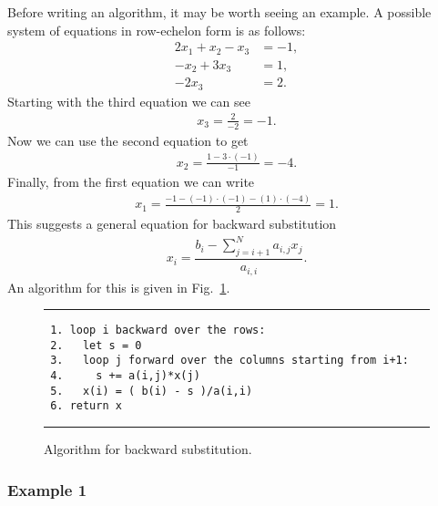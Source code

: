 Before writing an algorithm, it may be worth seeing an example. A possible system of equations in row-echelon form is as follows:
\begin{align}
  2x_1 + x_2 - x_3  &= -1, \nonumber \\
        -x_2 + 3x_3 &= 1, \nonumber \\
              -2x_3 &= 2. \nonumber
\end{align}
Starting with the third equation we can see
\begin{align}
  x_3 = \frac{2}{-2} = -1. \nonumber
\end{align}
Now we can use the second equation to get
\begin{align}
  x_2 = \frac{1 - 3\cdot(-1)}{-1} = -4. \nonumber
\end{align}
Finally, from the first equation we can write
\begin{align}
  x_1 = \frac{-1 - (-1)\cdot(-1) - (1)\cdot(-4)}{2} = 1. \nonumber
\end{align}
This suggests a general equation for backward substitution
\begin{align}
  x_i = \dfrac{ b_i - \displaystyle\sum_{j=i+1}^N a_{i,j} x_j }{ a_{i,i} }.
\end{align}
An algorithm for this is given in Fig.~\ref{Fig:linearAlgebra_backwardSubstitutionAlgorithm}.

\begin{figure}[htb!]
\begin{center}
\noindent \rule{\textwidth}{1pt}
\begin{verbatim}
 1.	loop i backward over the rows:
 2.	  let s = 0
 3.	  loop j forward over the columns starting from i+1:
 4.	    s += a(i,j)*x(j)
 5.	  x(i) = ( b(i) - s )/a(i,i)
 6.	return x
\end{verbatim}
\rule{\textwidth}{1pt}
\caption{Algorithm for backward substitution.}
\label{Fig:linearAlgebra_backwardSubstitutionAlgorithm}
\end{center}
\end{figure}

\subsubsection{Example 1} 

